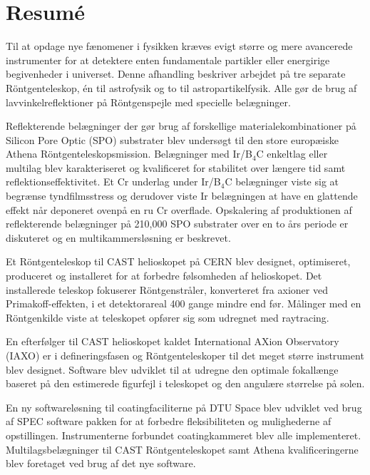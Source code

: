 \chapter{Resum\'e} %
Til at opdage nye fænomener i fysikken kræves evigt større og mere avancerede instrumenter for at detektere enten fundamentale partikler eller energirige begivenheder i universet. Denne afhandling beskriver arbejdet på tre separate Röntgenteleskop, én til astrofysik og to til astropartikelfysik. Alle gør de brug af lavvinkelreflektioner på Röntgenspejle med specielle belægninger.

Reflekterende belægninger der gør brug af forskellige materialekombinationer på Silicon Pore Optic (SPO) substrater blev undersøgt til den store europæiske Athena Röntgenteleskopsmission. Belægninger med Ir/B$_4$C enkeltlag eller multilag blev karakteriseret og kvalificeret for stabilitet over længere tid samt reflektionseffektivitet. Et Cr underlag under Ir/B$_4$C belægninger viste sig at begrænse tyndfilmsstress og derudover viste Ir belægningen at have en glattende effekt når deponeret ovenpå en ru Cr overflade. Opskalering af produktionen af reflekterende belægninger på 210,000 SPO substrater over en to års periode er diskuteret og en multikammersløsning er beskrevet.

Et Röntgenteleskop til CAST helioskopet på CERN blev designet, optimiseret, produceret og installeret for at forbedre følsomheden af helioskopet. Det installerede teleskop fokuserer Röntgenstråler, konverteret fra axioner ved Primakoff-effekten, i et detektorareal 400 gange mindre end før. Målinger med en Röntgenkilde viste at teleskopet opfører sig som udregnet med raytracing.

En efterfølger til CAST helioskopet kaldet International AXion Observatory (IAXO) er i defineringsfasen og Röntgenteleskoper til det meget større instrument blev designet. Software blev udviklet til at udregne den optimale fokallænge baseret på den estimerede figurfejl i teleskopet og den angulære størrelse på solen.

En ny softwareløsning til coatingfaciliterne på DTU Space blev udviklet ved brug af SPEC software pakken for at forbedre fleksibiliteten og mulighederne af opstillingen. Instrumenterne forbundet coatingkammeret blev alle implementeret. Multilagsbelægninger til CAST Röntgenteleskopet samt Athena kvalificeringerne blev foretaget ved brug af det nye software.

